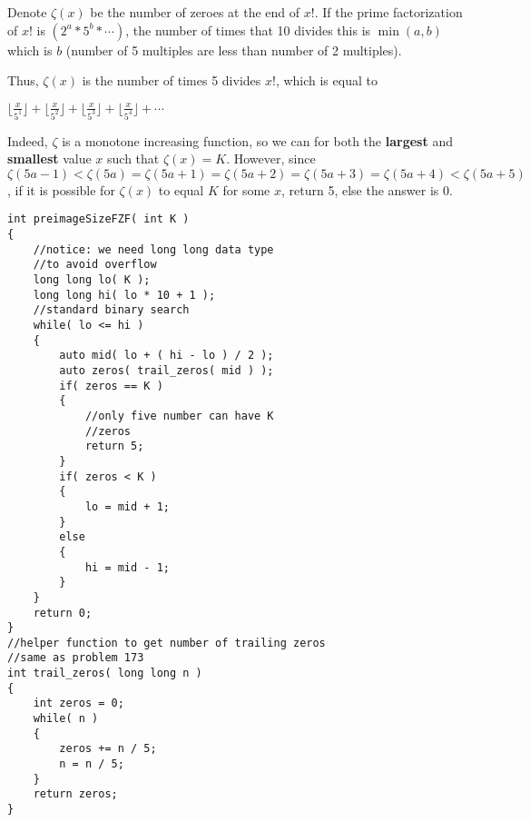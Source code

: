 Denote $\zeta(x)$ be the number of zeroes at the end of $x!$. If the prime factorization of $ x! $ is $ (2^a * 5^b * \cdots )$, the number of times that 10 divides this is $\min(a, b)$ which is $b$ (number of 5 multiples are less than number of 2 multiples).

Thus, $\zeta(x)$ is the number of times 5 divides $ x! $, which is equal to 

$ \lfloor \frac{x}{5^1} \rfloor + \lfloor \frac{x}{5^2} \rfloor + \lfloor \frac{x}{5^3} \rfloor + \lfloor \frac{x}{5^4} \rfloor + \cdots $

Indeed, $\zeta$ is a monotone increasing function, so we can for both the \textbf{largest} and \textbf{smallest} value $ x $ such that $ \zeta(x) = K $. However, since $ \zeta(5a-1) < \zeta(5a) = \zeta(5a+1) = \zeta(5a+2) = \zeta(5a+3) = \zeta(5a+4) < \zeta(5a+5) $, if it is possible for $ \zeta(x) $ to equal $ K $ for some $ x $, return 5, else the answer is 0.

\setcounter{lstlisting}{0}
\begin{lstlisting}[style=customc, caption={Binary Search}]
int preimageSizeFZF( int K )
{
    //notice: we need long long data type
    //to avoid overflow
    long long lo( K );
    long long hi( lo * 10 + 1 );
    //standard binary search
    while( lo <= hi )
    {
        auto mid( lo + ( hi - lo ) / 2 );
        auto zeros( trail_zeros( mid ) );
        if( zeros == K )
        {
            //only five number can have K
            //zeros
            return 5;
        }
        if( zeros < K )
        {
            lo = mid + 1;
        }
        else
        {
            hi = mid - 1;
        }
    }
    return 0;
}
//helper function to get number of trailing zeros
//same as problem 173
int trail_zeros( long long n )
{
    int zeros = 0;
    while( n )
    {
        zeros += n / 5;
        n = n / 5;
    }
    return zeros;
}
\end{lstlisting}